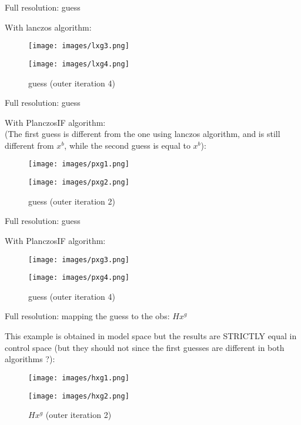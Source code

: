 \documentclass[francais]{beamer}
\begin{document}
\begin{frame}{Full resolution: guess}
\begin{center}
With lanczos algorithm:
\begin{figure}
  \texttt{[image: images/lxg3.png]}
  \caption{guess (outer iteration 3)}
\endminipage \hfill
{}%
  \texttt{[image: images/lxg4.png]}
  \caption{guess (outer iteration 4)}
\endminipage
\end{figure}
\end{center}
\end{frame}

\begin{frame}{Full resolution: guess}
\begin{center}
With PlanczosIF algorithm:\\
(The first guess is different from the one using lanczos algorithm, and is still different from $x^b$, while the second guess is equal to $x^b$):
\begin{figure}
  \texttt{[image: images/pxg1.png]}
  \caption{guess (outer iteration 1)}
\endminipage\hfill
{}
  \texttt{[image: images/pxg2.png]}
  \caption{guess (outer iteration 2)}
\endminipage
\end{figure}
\end{center}
\end{frame}

\begin{frame}{Full resolution: guess}
\begin{center}
With PlanczosIF algorithm:
\begin{figure}
  \texttt{[image: images/pxg3.png]}
  \caption{guess (outer iteration 3)}
\endminipage \hfill
{}%
  \texttt{[image: images/pxg4.png]}
  \caption{guess (outer iteration 4)}
\endminipage
\end{figure}
\end{center}
\end{frame}

\begin{frame}{Full resolution: mapping the guess to the obs: $H x^g$}
\begin{center}
This example is obtained in model space but the results are STRICTLY equal in control space (but they should not since the first guesses are different in both algorithms ?):
\begin{figure}
  \texttt{[image: images/hxg1.png]}
  \caption{$H x^g$ (outer iteration 1)}
\endminipage\hfill
{}
  \texttt{[image: images/hxg2.png]}
  \caption{$H x^g$ (outer iteration 2)}
\endminipage
\end{figure}
\end{center}
\end{frame}
\end{document}
